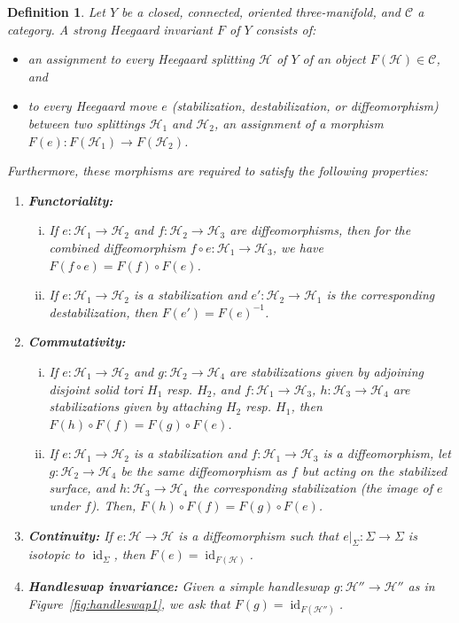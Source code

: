 \documentclass [11pt]{amsart}
\newtheorem {definition}[theorem]{Definition}
\theoremstyle{remark}
\def\Cat{\mathcal{C}}
\def\cH{\mathcal{H}}
\def\id{\operatorname{id}}
\begin{document}
\begin{definition}
\label{def:JT}
Let $Y$ be a closed, connected, oriented three-manifold, and $\Cat$ a category. A {\em strong Heegaard invariant} $F$ of $Y$ consists of:
\begin{itemize}
\item an assignment to every Heegaard splitting $\cH$ of $Y$ of an object $F(\cH) \in \Cat$, and
\item to every Heegaard move $e$ (stabilization, destabilization, or diffeomorphism) between two splittings $\cH_1$ and $\cH_2$, an assignment of a morphism $F(e): F(\cH_1) \to F(\cH_2)$.
\end{itemize}

Furthermore, these morphisms are required to satisfy the following properties:
\begin{enumerate}
\item {\bf Functoriality:} 
\begin{enumerate}[(i)]
\item If $e: \cH_1 \to \cH_2$ and $f: \cH_2 \to \cH_3$ are diffeomorphisms, then for the combined diffeomorphism $f \circ e: \cH_1 \to \cH_3$, we have $F(f \circ e) = F(f) \circ F(e)$. 
\item If $e : \cH_1 \to \cH_2$ is a stabilization and $e': \cH_2 \to \cH_1$ is the corresponding destabilization, then $F(e') = F(e)^{-1}$.
\end{enumerate}

\item {\bf Commutativity:}
\begin{enumerate}[(i)]
\item If $e : \cH_1 \to \cH_2$ and $g: \cH_2 \to \cH_4$ are stabilizations given by adjoining disjoint solid tori $H_1$ resp. $H_2$, and $f: \cH_1 \to {\cH}_3$, $h:{\cH}_3 \to \cH_4$ are stabilizations given by attaching $H_2$ resp. $H_1$, then $F(h) \circ F(f) = F(g) \circ F(e)$.
\item If $e : \cH_1 \to \cH_2$ is a stabilization and  $f: \cH_1 \to \cH_3$ is a diffeomorphism, let $g: \cH_2 \to \cH_4$ be the same diffeomorphism as $f$ but acting on the stabilized surface, and $h: \cH_3 \to \cH_4$ the corresponding stabilization (the image of $e$ under $f$). Then, $F(h) \circ F(f) = F(g) \circ F(e)$.
\end{enumerate}

\item {\bf Continuity:} If $e: \cH \to \cH$ is a diffeomorphism such that $e|_{\Sigma}: \Sigma \to \Sigma$ is isotopic to $\id_{\Sigma}$, then $F(e) = \id_{F(\cH)}$.

\item {\bf Handleswap invariance:} Given a simple handleswap $g: \cH'' \to \cH''$ as in Figure~\ref{fig:handleswap1}, we ask that $F(g) = \id_{F(\cH'')}$.
\end{enumerate}
\end{definition}
\end{document}
